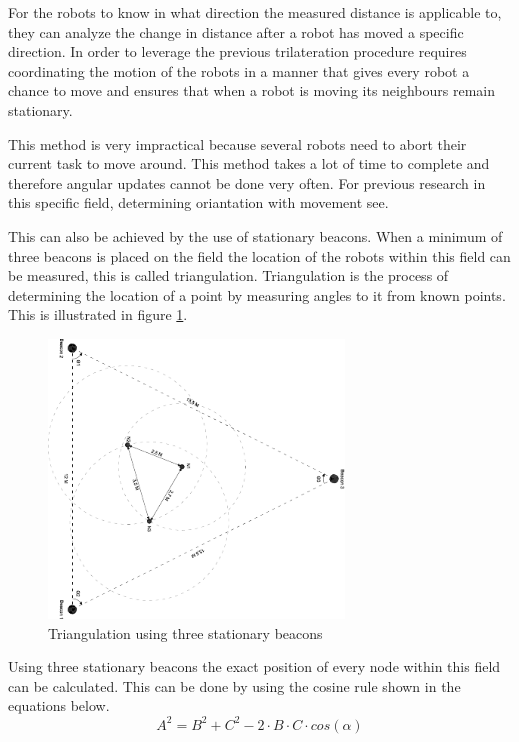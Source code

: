 \documentclass[10pt,a4paper]{article}
\begin{document}
For the robots to know in what direction the measured distance is applicable to, they can analyze the change in distance after a robot has moved a specific direction. In order to leverage the previous trilateration procedure requires coordinating the motion of the robots in a manner that gives every robot a chance to move and ensures that when a robot is moving its neighbours remain stationary. \cite{Angle}

This method is very impractical because several robots need to abort their current task to move around. This method takes a lot of time to complete and therefore angular updates cannot be done very often. For previous research in this specific field, determining oriantation with movement see.\cite{delft}

This can also be achieved by the use of stationary beacons. When a minimum of three beacons is placed on the field the location of the robots within this field can be measured, this is called triangulation. Triangulation is the process of determining the location of a point by measuring angles to it from known points. This is illustrated in figure \ref{driehoek}.

\begin{figure}[H]
\centering
\includegraphics[angle=90,width=0.7\textwidth]{driehoek.pdf}
\caption{Triangulation using three stationary beacons}
\label{driehoek}
\end{figure}

Using three stationary beacons the exact position of every node within this field can be calculated. This can be done by using the cosine rule shown in the equations below. 
\begin{equation}
A^2 = B^2 + C^2 - 2\cdot B\cdot C\cdot cos(\alpha)
\end{equation}
\end{document}
